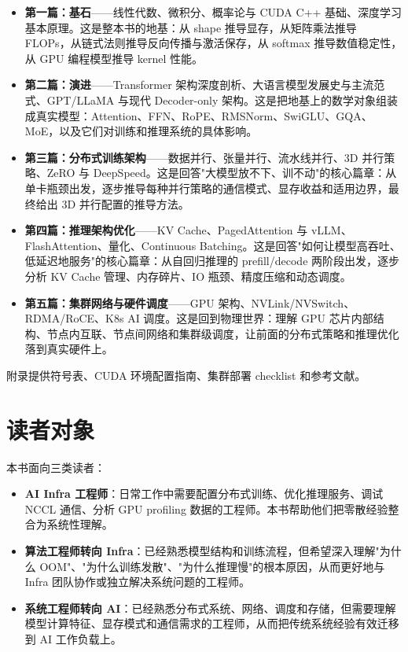 \begin{itemize}
\item \textbf{第一篇：基石}——线性代数、微积分、概率论与 CUDA C++ 基础、深度学习基本原理。这是整本书的地基：从 shape 推导显存，从矩阵乘法推导 FLOPs，从链式法则推导反向传播与激活保存，从 softmax 推导数值稳定性，从 GPU 编程模型推导 kernel 性能。
\item \textbf{第二篇：演进}——Transformer 架构深度剖析、大语言模型发展史与主流范式、GPT/LLaMA 与现代 Decoder-only 架构。这是把地基上的数学对象组装成真实模型：Attention、FFN、RoPE、RMSNorm、SwiGLU、GQA、MoE，以及它们对训练和推理系统的具体影响。
\item \textbf{第三篇：分布式训练架构}——数据并行、张量并行、流水线并行、3D 并行策略、ZeRO 与 DeepSpeed。这是回答"大模型放不下、训不动"的核心篇章：从单卡瓶颈出发，逐步推导每种并行策略的通信模式、显存收益和适用边界，最终给出 3D 并行配置的推导方法。
\item \textbf{第四篇：推理架构优化}——KV Cache、PagedAttention 与 vLLM、FlashAttention、量化、Continuous Batching。这是回答"如何让模型高吞吐、低延迟地服务"的核心篇章：从自回归推理的 prefill/decode 两阶段出发，逐步分析 KV Cache 管理、内存碎片、IO 瓶颈、精度压缩和动态调度。
\item \textbf{第五篇：集群网络与硬件调度}——GPU 架构、NVLink/NVSwitch、RDMA/RoCE、K8s AI 调度。这是回到物理世界：理解 GPU 芯片内部结构、节点内互联、节点间网络和集群级调度，让前面的分布式策略和推理优化落到真实硬件上。
\end{itemize}

附录提供符号表、CUDA 环境配置指南、集群部署 checklist 和参考文献。

\section*{读者对象}

本书面向三类读者：

\begin{itemize}
\item \textbf{AI Infra 工程师}：日常工作中需要配置分布式训练、优化推理服务、调试 NCCL 通信、分析 GPU profiling 数据的工程师。本书帮助他们把零散经验整合为系统性理解。
\item \textbf{算法工程师转向 Infra}：已经熟悉模型结构和训练流程，但希望深入理解"为什么 OOM"、"为什么训练发散"、"为什么推理慢"的根本原因，从而更好地与 Infra 团队协作或独立解决系统问题的工程师。
\item \textbf{系统工程师转向 AI}：已经熟悉分布式系统、网络、调度和存储，但需要理解模型计算特征、显存模式和通信需求的工程师，从而把传统系统经验有效迁移到 AI 工作负载上。
\end{itemize}

